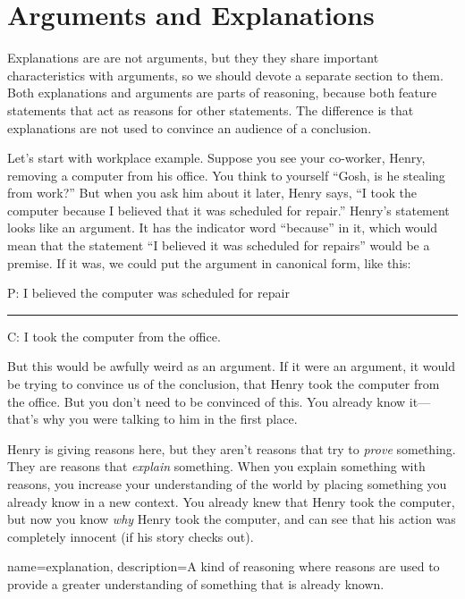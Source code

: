 \section{Arguments and Explanations}
\label{arguments_and_explanations}

Explanations are are not arguments, but they they share important characteristics with arguments, so we should devote a separate section to them. Both explanations and arguments are parts of reasoning, because both feature statements that act as reasons for other statements. The difference is that explanations are not used to convince an audience of a conclusion.  

Let's start with workplace example. Suppose you see your co-worker, Henry, removing a computer from his office. You think to yourself ``Gosh, is he stealing from work?'' But when you ask him about it later, Henry says, ``I took the computer because I believed that it was scheduled for repair.'' Henry's statement looks like an argument. It has the indicator word ``because'' in it, which would mean that the statement ``I believed it was scheduled for repairs'' would be a premise. If it was, we could put the argument in canonical form, like this: 

\begin{earg}
\item[P:] I believed the computer was scheduled for repair
\vspace{-.5em}
\item [] \rule{0.6\linewidth}{.5pt} 
\item[C:] I took the computer from the office. 
\end{earg} 

But this would be awfully weird as an argument. If it were an argument, it would be trying to convince us of the conclusion, that Henry took the computer from the office. But you don't need to be convinced of this. You already know it---that's why you were talking to him in the first place. 
  
Henry is giving reasons here, but they aren't reasons that try to \textit{prove} something. They are reasons that \textit{explain} something. When you explain something with reasons, you increase your understanding of the world by placing something you already know in a new context. You already knew that Henry took the computer, but now you know \textit{why} Henry took the computer, and can see that his action was completely innocent (if his story checks out). 


{
name=explanation,
description={A kind of reasoning where reasons are used to provide a greater understanding of something that is already known.}
}

